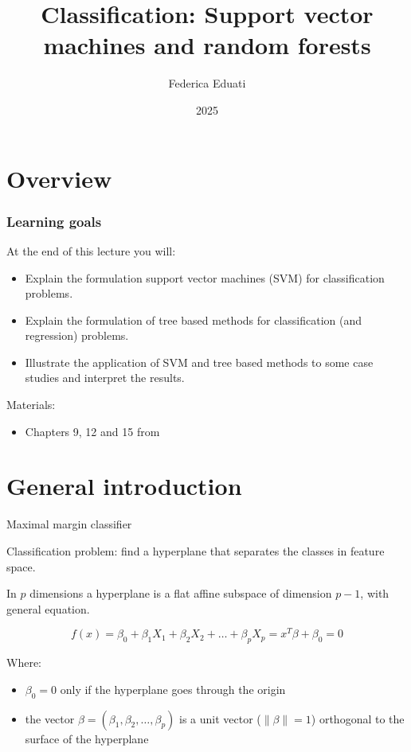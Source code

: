 \documentclass[notes]{beamer}          %
\title{Classification: Support vector machines and random forests}
\author{Federica Eduati}
\institute{Eindhoven University of Technology

Department of Biomedical Engineering}
\date{2025}
\newcommand{\norm}[1]{\left\lVert#1\right\rVert}
\providecommand{\norm}[1]{\lVert#1\rVert}
\begin{document}
 
\frame{\titlepage}
 
\section{Overview}

\begin{frame}
\frametitle{Learning goals}

At the end of this lecture you will:
\begin{itemize}
    \item Explain the formulation support vector machines (SVM) for classification problems.
    \item Explain the formulation of tree based methods for classification (and regression) problems.
    \item Illustrate the application of SVM and tree based methods to some case studies and interpret the results.
\end{itemize}

\vspace{5mm} 

Materials: 
\begin{itemize}
    \item Chapters 9, 12 and 15 from \cite{elements}
\end{itemize}

\end{frame}




\section{General introduction}
\begin{frame}{Maximal margin classifier}

Classification problem: find a hyperplane that separates the classes in feature space.

\vspace{5mm} 

In $p$ dimensions a hyperplane is a flat affine subspace of dimension $p-1$, with general equation.

\begin{equation}
    f(x) = \beta_0 + \beta_1 X_1 + \beta_2 X_2 + \dots + \beta_p X_p = x^T\beta + \beta_0 = 0
\end{equation}

Where:
\begin{itemize}
    \item $\beta_0 = 0$ only if the hyperplane goes through the origin \item the vector $\beta = (\beta_1, \beta_2, \dots, \beta_p)$ is a unit vector ($\norm{\beta} = 1$) orthogonal to the surface of the hyperplane
\end{itemize}
    
\end{frame}
\end{document}
